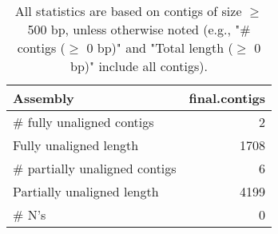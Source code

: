 \documentclass[12pt,a4paper]{article}
\begin{document}
\begin{table}[ht]
\begin{center}
\caption{All statistics are based on contigs of size $\geq$ 500 bp, unless otherwise noted (e.g., "\# contigs ($\geq$ 0 bp)" and "Total length ($\geq$ 0 bp)" include all contigs).}
\begin{tabular}{|l*{1}{|r}|}
\hline
Assembly & final.contigs \\ \hline
\# fully unaligned contigs & 2 \\ \hline
Fully unaligned length & 1708 \\ \hline
\# partially unaligned contigs & 6 \\ \hline
Partially unaligned length & 4199 \\ \hline
\# N's & 0 \\ \hline
\end{tabular}
\end{center}
\end{table}
\end{document}
